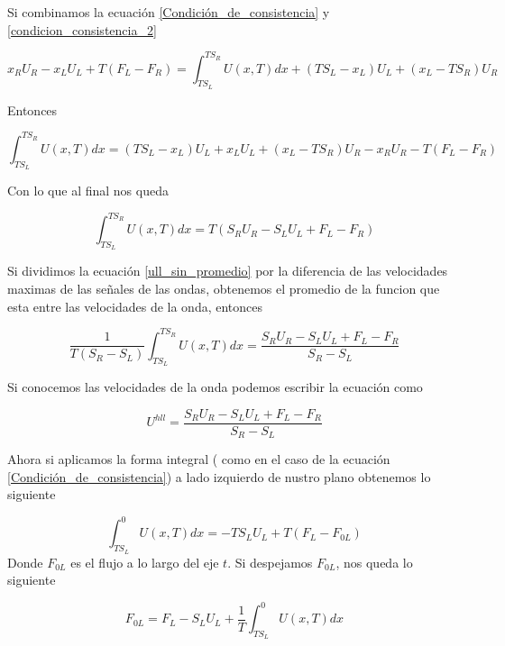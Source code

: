\documentclass[12pt,a4paper]{book}
\begin{document}
Si combinamos la ecuación \ref{Condición_de_consistencia} y 
\ref{condicion_consistencia_2}

\begin{equation*}
x_R U_R -x_L U_L+T \left( F_L- F_R \right) =
\int_{T S_L}^{T S_R} U \left(x, T \right)dx+
\left( T S_L - x_L \right) U_L+
\left( x_L - T S_R \right) U_R
\end{equation*}

Entonces 

\begin{equation*}
\int_{T S_L}^{T S_R} U \left(x, T \right)dx=
\left( T S_L - x_L \right) U_L+ x_L U_L +
\left( x_L - T S_R \right) U_R-x_R U_R -
T \left( F_L- F_R \right)
\end{equation*}

Con lo que al final nos queda

\begin{equation} \label{ull_sin_promedio}
\int_{T S_L}^{T S_R} U \left(x, T \right)dx=
T \left( S_R U_R - S_L U_L + F_L - F_R \right)
\end{equation}

Si dividimos la ecuación \ref{ull_sin_promedio} por la diferencia de las velocidades maximas de las señales de las ondas, obtenemos el promedio de la funcion que esta entre las velocidades de la onda, entonces

\begin{equation}
\frac{1}{T \left( S_R -S_L \right)}\int_{T S_L}^{T S_R} U \left(x, T \right)dx =
\frac{S_R U_R - S_L U_L + F_L - F_R}{S_R - S_L}
\end{equation}

Si conocemos las velocidades de la onda podemos escribir la ecuación como 

\begin{equation}\label{u_hll}
U^{hll} = \frac{S_R U_R - S_L U_L + F_L - F_R}{S_R - S_L}
\end{equation}

Ahora si aplicamos la forma integral ( como en el caso de la ecuación \ref{Condición_de_consistencia}) a lado izquierdo de nustro plano obtenemos lo siguiente

\begin{equation}
\int_{T S_L}^{0} U\left( x, T \right) dx = 
-T S_L U_L+T \left( F_L- F_{0L} \right)
\end{equation}
Donde $F_{0L}$ es el flujo a lo largo del eje $t$. Si despejamos $F_{0L}$, nos queda lo siguiente

\begin{equation}\label{ec F_0L}
F_{0L} = F_L - S_L U_L + \frac{1}{T}  \int_{T S_L}^{0} U\left( x, T \right) dx
\end{equation}
\end{document}
